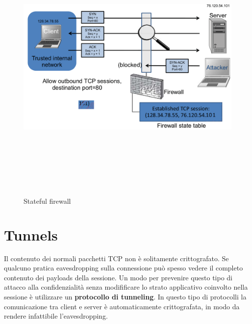 \begin{figure}[htbp]
	\centering%
	\subfigure%
	{\includegraphics[height=13cm, width=13cm, keepaspectratio]{Immagini/firewalls/stateful_firewall.png}}
	\caption{Stateful firewall \label{fig:stateful_firewall}} 	
\end{figure}

\section{Tunnels}
Il contenuto dei normali pacchetti TCP non è solitamente crittografato. Se qualcuno pratica eavesdropping sulla connessione può spesso vedere il completo contenuto dei payloads della sessione. Un modo per prevenire questo tipo di attacco alla confidenzialità senza modifificare lo strato applicativo coinvolto nella sessione è utilizzare un \textbf{protocollo di tunneling}. In questo tipo di protocolli la comunicazione tra client e server è automaticamente crittografata, in modo da rendere infattibile l'eavesdropping.

